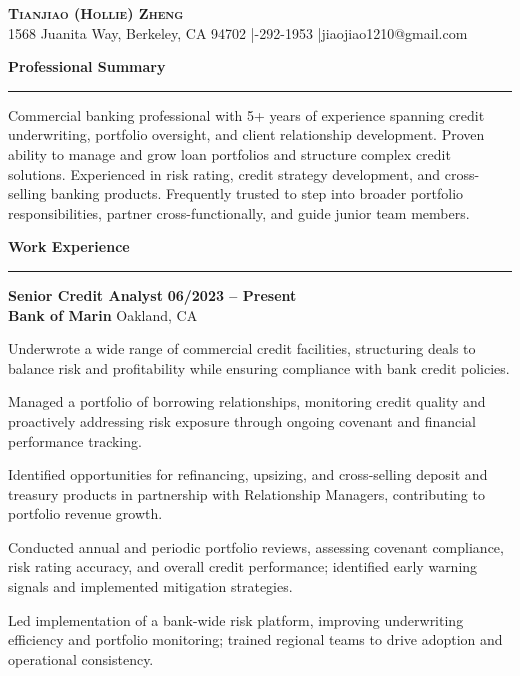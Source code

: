 \documentclass[letterpaper,11pt]{article}
\renewcommand{\section}[1]{%
  \vspace{5pt}%
  {\large\bfseries\color{sectionblue}#1}\\[-6pt]%
  {\color{sectionblue}\rule{\textwidth}{0.8pt}}%
  \vspace{1pt}%
}
\renewenvironment{itemize}{%
  \begin{list}{\textbullet}{%
    \setlength{\leftmargin}{1.5em}%
    \setlength{\itemsep}{1pt}%
    \setlength{\parsep}{0pt}%
    \setlength{\topsep}{1pt}%
    \setlength{\partopsep}{0pt}%
  }%
}{\end{list}}
\begin{document}
\begin{center}
{\LARGE\textsc{\textbf{Tianjiao (Hollie) Zheng}}}\\[2pt]
1568 Juanita Way, Berkeley, CA 94702 \enspace|-292-1953 \enspace|\enspace jiaojiao1210@gmail.com
\end{center}

\section{Professional Summary}

Commercial banking professional with 5+ years of experience spanning credit underwriting, portfolio oversight, and client relationship development. Proven ability to manage and grow loan portfolios and structure complex credit solutions. Experienced in risk rating, credit strategy development, and cross-selling banking products. Frequently trusted to step into broader portfolio responsibilities, partner cross-functionally, and guide junior team members.

\section{Work Experience}

\textbf{Senior Credit Analyst} \hfill \textbf{06/2023 -- Present}\\
\textbf{Bank of Marin} \hfill Oakland, CA
\begin{itemize}
  \item Underwrote a wide range of commercial credit facilities, structuring deals to balance risk and profitability while ensuring compliance with bank credit policies.
  \item Managed a portfolio of borrowing relationships, monitoring credit quality and proactively addressing risk exposure through ongoing covenant and financial performance tracking.
  \item Identified opportunities for refinancing, upsizing, and cross-selling deposit and treasury products in partnership with Relationship Managers, contributing to portfolio revenue growth.
  \item Conducted annual and periodic portfolio reviews, assessing covenant compliance, risk rating accuracy, and overall credit performance; identified early warning signals and implemented mitigation strategies.
  \item Led implementation of a bank-wide risk platform, improving underwriting efficiency and portfolio monitoring; trained regional teams to drive adoption and operational consistency.
\end{itemize}
\end{document}
